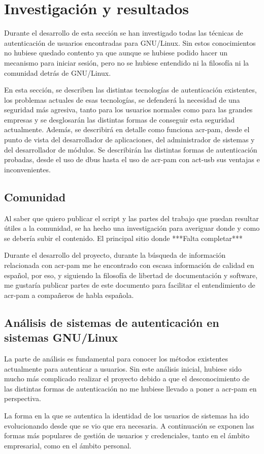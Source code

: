 \documentclass[twoside, titlepage, 12pt, a4paper]{article}
\let\oldsection\section
\def\section{\cleardoublepage\oldsection}
\begin{document}
\section{Investigación y resultados}
Durante el desarrollo de esta sección se han investigado todas las técnicas de autenticación de usuarios encontradas para \gls{GNU/Linux}. Sin estos conocimientos no hubiese quedado contento ya que aunque se hubiese podido hacer un mecanismo para iniciar sesión, pero no se hubiese entendido ni la filosofía ni la comunidad detrás de \gls{GNU/Linux}. \par
En esta sección, se describen las distintas tecnologías de autenticación existentes, los problemas actuales de esas tecnologías, se defenderá la necesidad de una seguridad más agresiva, tanto para los usuarios normales como para las grandes empresas y se desglosarán las distintas formas de conseguir esta seguridad actualmente. Además, se describirá en detalle como funciona \gls{acr-pam}, desde el punto de vista del desarrollador de aplicaciones, del administrador de sistemas y del desarrollador de módulos. Se describirán las distintas formas de autenticación probadas, desde el uso de \gls{dbus} hasta el uso de \gls{acr-pam} con \gls{act-usb} sus ventajas e inconvenientes.
\subsection{Comunidad}
Al saber que quiero publicar el script y las partes del trabajo que puedan resultar útiles a la comunidad, se ha hecho una investigación para averiguar donde y como se debería subir el contenido. El principal sitio donde ***Falta completar***\par
Durante el desarrollo del proyecto, durante la búsqueda de información relacionada con \gls{acr-pam} me he encontrado con escasa información de calidad en español, por eso, y siguiendo la filosofía de libertad de documentación y software, me gustaría publicar partes de este documento para facilitar el entendimiento de \gls{acr-pam} a compañeros de habla española.
\subsection{Análisis de sistemas de autenticación en sistemas \gls{GNU/Linux}}
La parte de análisis es fundamental para conocer los métodos existentes actualmente para autenticar a usuarios. Sin este análisis inicial, hubiese sido mucho más complicado realizar el proyecto debido a que el desconocimiento de las distintas formas de autenticación no me hubiese llevado a poner a \gls{acr-pam} en perspectiva. \par
La forma en la que se autentica la identidad de los usuarios de sistemas ha ido evolucionando desde que se vio que era necesaria. A continuación se exponen las formas más populares de gestión de usuarios y credenciales, tanto en el ámbito empresarial, como en el ámbito personal.
\end{document}
